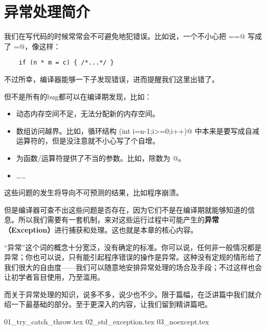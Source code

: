 \chapter{异常处理简介}
我们在写代码的时候常常会不可避免地犯错误。比如说，一个不小心把 \lstinline@==@ 写成了 \lstinline@=@，像这样：
\begin{lstlisting}
    if (n * m = c) { /*...*/ }
\end{lstlisting}
不过所幸，编译器能够一下子发现错误，进而提醒我们这里出错了。\par
但不是所有的bug都可以在编译期发现，比如：
\begin{itemize}
    \item 动态内存空间不足，无法分配新的内存空间。
    \item 数组访问越界。比如，循环结构 \lstinline@\for(int i=n-1;i>=0;i++)@ 中本来是要写成自减运算符的，但是没注意就不小心写了个自增。
    \item 为函数/运算符提供了不当的参数。比如，除数为 @。
    \item ……
\end{itemize}
这些问题的发生将导向不可预测的结果，比如程序崩溃。\par
但是编译器可查不出这些问题是否存在，因为它们不是在编译期就能够知道的信息。所以我们需要有一套机制，来对这些运行过程中可能产生的\textbf{异常（Exception）}进行捕获和处理。这也就是本章的核心内容。\par
``异常''这个词的概念十分宽泛，没有确定的标准。你可以说，任何非一般情况都是异常；你也可以说，只有能引起程序错误的操作是异常。这种没有定规的情形给了我们很大的自由度——我们可以随意地安排异常处理的场合及手段；不过这样也会让初学者盲目使用，乃至滥用。\par
而关于异常处理的知识，说多不多，说少也不少。限于篇幅，在泛讲篇中我们就介绍一下最基础的部分。至于更深入的内容，让我们留到精讲篇吧。\par
{01_try_catch_throw.tex}
{02_std_exception.tex}
{03_noexcept.tex}